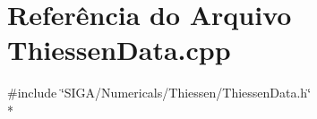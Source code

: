 \section{Referência do Arquivo Thiessen\+Data.\+cpp}
\label{_thiessen_data_8cpp}
{\ttfamily \#include \char`\"{}S\+I\+G\+A/\+Numericals/\+Thiessen/\+Thiessen\+Data.\+h\char`\"{}}\\*
